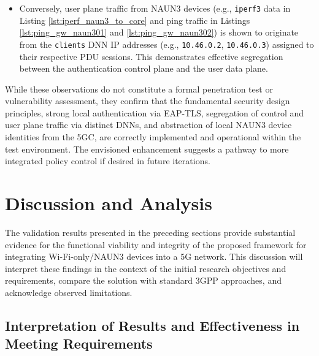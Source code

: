 \begin{itemize}
{\begin{itemize}
\begin{lstlisting}[caption=\texttt{hostapd} failing due to wrong local address,label={lst:hostapd_fail}]
(...)
25 | 1748702388.755637: RADIUS local address: 10.0.2.15:42579
(...)
216| 1748702566.372520: RADIUS local address: 10.45.0.2:50371
(...)
\end{lstlisting}

            \item Conversely, user plane traffic from \ac{NAUN3} devices (e.g., \texttt{iperf3} data in Listing \ref{lst:iperf_naun3_to_core} and ping traffic in Listings \ref{lst:ping_gw_naun301} and \ref{lst:ping_gw_naun302}) is shown to originate from the \texttt{clients} \ac{DNN} \ac{IP} addresses (e.g., \texttt{10.46.0.2}, \texttt{10.46.0.3}) assigned to their respective \ac{PDU} sessions. This demonstrates effective segregation between the authentication control plane and the user data plane.
        \end{itemize}
    }
\end{itemize}

While these observations do not constitute a formal penetration test or vulnerability assessment, they confirm that the fundamental security design principles, strong local authentication via \ac{EAP-TLS}, segregation of control and user plane traffic via distinct \acp{DNN}, and abstraction of local \ac{NAUN3} device identities from the \ac{5GC}, are correctly implemented and operational within the test environment. The envisioned enhancement suggests a pathway to more integrated policy control if desired in future iterations.

\section{Discussion and Analysis}

The validation results presented in the preceding sections provide substantial evidence for the functional viability and integrity of the proposed framework for integrating Wi-Fi-only/\ac{NAUN3} devices into a \ac{5G} network. This discussion will interpret these findings in the context of the initial research objectives and requirements, compare the solution with standard \ac{3GPP} approaches, and acknowledge observed limitations.

\subsection{Interpretation of Results and Effectiveness in Meeting Requirements}

